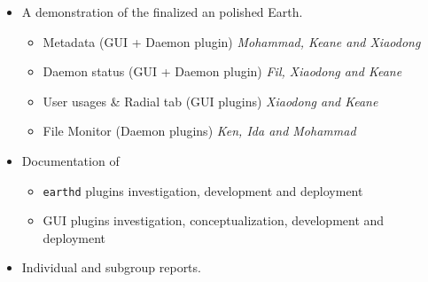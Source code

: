 \documentclass{article}
\begin{document}
\begin{itemize}
    \item A demonstration of the finalized an polished Earth. 
        \begin{itemize}
            \item Metadata (GUI + Daemon plugin) \textit{Mohammad, Keane and Xiaodong}
            \item Daemon status (GUI + Daemon plugin) \textit{Fil, Xiaodong and Keane}
            \item User usages \& Radial tab (GUI plugins) \textit{Xiaodong and Keane}
            \item File Monitor (Daemon plugins) \textit{Ken, Ida and Mohammad}
        \end{itemize}
    \item Documentation of
        \begin{itemize}
            \item \texttt{earthd} plugins investigation, development and deployment
            \item GUI plugins investigation, conceptualization, development and deployment
        \end{itemize}
    \item Individual and subgroup reports.
\end{itemize}
\end{document}
